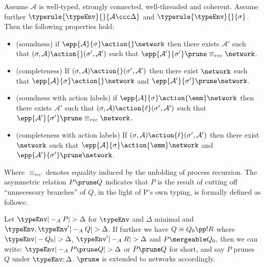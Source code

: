 \begin{theorem}
  \label{Logic4Struct:theorem:epp}
  Assume $\mathcal A$ is well-typed, strongly connected, well-threaded
  and coherent. Assume further $\typerule{\typeEnv}{}{\mathcal A \ccc
    \Delta}$ and $\typerule{\typeEnv}{}{\sigma}$. Then the following
  properties hold: 

\begin{itemize}
  \item (soundness) if $\epp{\mathcal{A}}{\sigma}\action{}  \network$
    then there exists $\mathcal A'$ such that $(\sigma, \mathcal{A}) \action{}
(\sigma', \mathcal{A'})$ such that $\epp{\mathcal{A'}}{\sigma'} \prune \equiv_{rec} \network$.

 \item (completeness) If $(\sigma, \mathcal{A}) \action{}  (\sigma', \mathcal{A'})$ then there exist $\network$ such
   that $\epp{\mathcal{A}}{\sigma} \action{} \network$ and $\epp{\mathcal{A'}}{\sigma'} \prune \network$.

  \item (soundness with action labels) if $\epp{\mathcal{A}}{\sigma}\action{\emm}  \network$
    then there exists $\mathcal A'$ such that $(\sigma, \mathcal{A}) \action{\ell}
(\sigma', \mathcal{A'})$ such that $\epp{\mathcal{A'}}{\sigma'} \prune \equiv_{rec} \network$.

 \item (completeness with action labels) If $(\sigma, \mathcal{A}) \action{\ell}  (\sigma', \mathcal{A'})$ then there exist $\network$ such
   that $\epp{\mathcal{A}}{\sigma} \action{\emm} \network$ and $\epp{\mathcal{A'}}{\sigma'} \prune \network$.

\end{itemize}
\end{theorem}

Where $\equiv_{rec}$ denotes equality induced by the unfolding of
process recursion. The asymmetric relation $P \prune Q$ indicates that $P$ is the result
of cutting off ``unnecessary branches'' of $Q$, in the light of P's
own typing, is formally defined as follows:


\begin{definition}[Pruning]\label{Logic4Struct:definition:pruning}
 Let $\typeEnv |-_{A} P |> \Delta$ for $\typeEnv$ and $\Delta$
minimal and $\typeEnv, \typeEnv' |-_{A} Q |> \Delta$. If further we
have $Q \equiv Q_0 \pp !R$ where $\typeEnv |- Q_0 |> \Delta$, $\typeEnv'
|-_{A} R |> \Delta$ and $P \mergeable Q_0$, then we can write: $\typeEnv |-_A P \prune Q |>
\Delta$ or $P \prune Q$ for short, and say $P$
prunes $Q$ under $\typeEnv; \Delta$. $\prune$ is extended to networks accordingly.
\end{definition}


